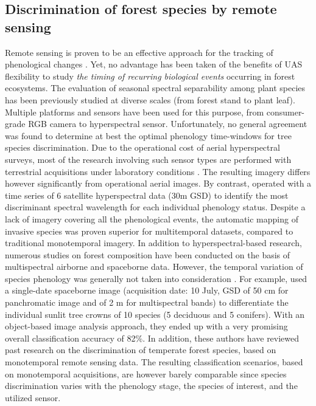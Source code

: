 \documentclass[remotesensing,article,submit,moreauthors,pdftex,12pt,a4paper]{mdpi} %
\begin{document}
\subsection{Discrimination of forest species by remote sensing}


Remote sensing is proven to be an effective approach for the tracking of phenological changes \cite{motohka_applicability_2010}. 
Yet, no advantage has been taken of the benefits of UAS flexibility to study \textit{the timing of recurring biological events} occurring in forest ecosystems. 
The evaluation of seasonal spectral separability among plant species has been previously studied at diverse scales (from forest stand to plant leaf). 
Multiple platforms and sensors have been used for this purpose, from consumer-grade RGB camera to hyperspectral sensor. 
Unfortunately, no general agreement was found to determine at best the optimal phenology time-windows for tree species discrimination. 
Due to the operational cost of aerial hyperspectral surveys, most of the research involving such sensor types are performed with terrestrial acquisitions under laboratory conditions \cite{burkholder_seasonal_2011, masaitis_influence_2013,cole_spectral_2014}. 
The resulting imagery differs however significantly from operational aerial images. 
By contrast, \citeauthor{somers_multitemporal_2013} \cite{somers_multitemporal_2013} operated with a time series of 6 satellite hyperspectral data (30m GSD) to identify the most discriminant spectral wavelength for each individual phenology status. 
Despite a lack of imagery covering all the phenological events, the automatic mapping of invasive species was proven superior for multitemporal datasets, compared to traditional monotemporal imagery.
In addition to hyperspectral-based research, numerous studies on forest composition have been conducted on the basis of multispectral airborne and spaceborne data. However, the temporal variation of species phenology was generally not taken into consideration \cite{heinzel_full_2008}. 
For example, \citeauthor{immitzer_tree_2012} \cite{immitzer_tree_2012} used a single-date spaceborne image (acquisition date: 10 July, GSD of 50 cm for panchromatic image and of 2 m for multispectral bands) to differentiate the individual sunlit tree crowns of 10 species (5 deciduous and 5 conifers). 
With an object-based image analysis approach, they ended up with a very promising overall classification accuracy of 82\%. 
In addition, these authors have reviewed past research on the discrimination of temperate forest species, based on monotemporal remote sensing data. 
The resulting classification scenarios, based on monotemporal acquisitions, are however barely comparable since species discrimination varies with the phenology stage, the species of interest, and the utilized sensor. 
\end{document}
